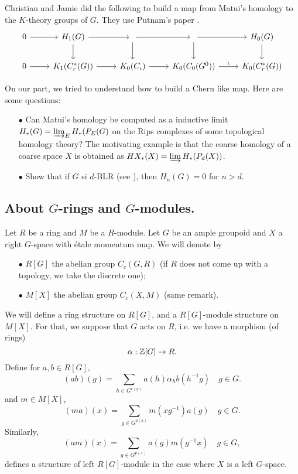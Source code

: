 Christian and Jamie did the following to build a map from Matui's homology to the $K$-theory groups of $G$. They use Putnam's paper \cite{putnam1997excision}.
\[\begin{tikzcd}
0\arrow{r} 	&	H_1(G) 		\arrow{r}\arrow{d}	&	\arrow{r}\arrow{d}	&		\arrow{r}\arrow{d}	& H_0(G) \arrow{d} \\
0\arrow{r}	&	K_1(C^*_r(G))	\arrow{r} 		&	K_0(C_\iota) \arrow{r}  & K_0(C_0(G^0))	\arrow{r}{\iota} 	& K_0(C^*_r(G))
\end{tikzcd}\]

On our part, we tried to understand how to build a Chern like map. Here are some questions:
\begin{itemize}
\item[$\bullet$] Can Matui's homology be computed as a inductive limit $H_*(G)= \varinjlim_E H_*(P_E(G)$ on the Rips complexes of some topological homology theory? The motivating example is that the coarse homology of a coarse space $X$ is obtained as $HX_*(X)=\varinjlim H_*(P_d(X))$. 
\item[$\bullet$] Show that if $G$ si $d$-BLR (see \cite{}), then $H_n(G)=0$ for $n>d$. 
\end{itemize}

\subsection{About $G$-rings and $G$-modules.}

Let $R$ be a ring and $M$ be a $R$-module. Let $G$ be an ample groupoid and $X$ a right $G$-space with \'etale momentum map. We will denote by 
\begin{itemize}
\item[$\bullet$] $R[G]$ the abelian group $C_c(G,R)$ (if $R$ does not come up with a topology, we take the discrete one);
\item[$\bullet$] $M[X]$ the abelian group $C_c(X,M)$ (same remark).
\end{itemize}
We will define a ring structure on $R[G]$, and a $R[G]$-module structure on $M[X]$. For that, we suppose that $G$ acts on $R$, i.e. we have a morphism (of rings)
\[\alpha : \mathbb Z[G] \rightarrow R.\]
Define for $a,b\in R[G]$,
\[(ab)(g) = \sum_{h\in G^{r(g)}} a(h)\alpha_h {b(h^{-1}g)} \quad g\in G.\]
and $m\in M[X]$,
\[(ma)(x) = \sum_{g\in G^{p(x)}} m(xg^{-1})a(g) \quad g\in G.\]
Similarly,
\[(am)(x) = \sum_{g\in G^{p(x)}}a(g) m(g^{-1}x) \quad g\in G,\]
defines a structure of left $R[G]$-module in the case where $X$ is a left $G$-space.\\

